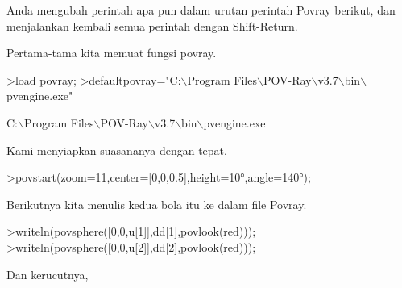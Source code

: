 \documentclass[a4paper,10pt]{article}
\begin{document}
\begin{eulernotebook}
\begin{eulercomment}
\begin{eulercomment}
\begin{eulercomment}
\begin{eulercomment}
\begin{eulercomment}
\begin{eulercomment}
\begin{eulercomment}
\begin{eulercomment}
\begin{eulercomment}
\begin{eulercomment}
\begin{eulercomment}
\begin{eulercomment}
\begin{eulercomment}
\begin{eulercomment}
\begin{eulercomment}
\begin{eulercomment}
\begin{eulercomment}
\begin{eulercomment}
\begin{eulercomment}
\begin{eulercomment}
\begin{eulercomment}
\begin{eulercomment}
\begin{eulercomment}
\begin{eulercomment}
\begin{eulercomment}
\begin{eulercomment}
\begin{eulercomment}
\begin{eulercomment}
\begin{eulercomment}
\begin{eulercomment}
\begin{eulercomment}
\begin{eulercomment}
\begin{eulercomment}
\begin{eulercomment}
\begin{eulercomment}
\begin{eulercomment}
\begin{eulercomment}
\begin{eulercomment}
\begin{eulercomment}
\begin{eulercomment}
\begin{eulercomment}
\begin{eulercomment}
\begin{eulercomment}
\begin{eulercomment}
\begin{eulercomment}
\begin{eulercomment}
\begin{eulercomment}
\begin{eulercomment}
\begin{eulercomment}
\begin{eulercomment}
\begin{eulercomment}
\begin{eulercomment}
\begin{eulercomment}
\begin{eulercomment}
\begin{eulercomment}
\begin{eulercomment}
\begin{eulercomment}
\begin{eulercomment}
\begin{eulercomment}
\begin{eulercomment}
\begin{eulercomment}
\begin{eulercomment}
\begin{eulercomment}
\begin{eulercomment}
\begin{eulercomment}
Anda
mengubah perintah apa pun dalam urutan perintah Povray berikut, dan
menjalankan kembali semua perintah dengan Shift-Return.

Pertama-tama kita memuat fungsi povray.
\end{eulercomment}
\begin{eulerprompt}
>load povray;
>defaultpovray="C:\(\backslash\)Program Files\(\backslash\)POV-Ray\(\backslash\)v3.7\(\backslash\)bin\(\backslash\)pvengine.exe"
\end{eulerprompt}
\begin{euleroutput}
  C:\(\backslash\)Program Files\(\backslash\)POV-Ray\(\backslash\)v3.7\(\backslash\)bin\(\backslash\)pvengine.exe
\end{euleroutput}
\begin{eulercomment}
Kami menyiapkan suasananya dengan tepat.
\end{eulercomment}
\begin{eulerprompt}
>povstart(zoom=11,center=[0,0,0.5],height=10°,angle=140°);
\end{eulerprompt}
\begin{eulercomment}
Berikutnya kita menulis kedua bola itu ke dalam file Povray.
\end{eulercomment}
\begin{eulerprompt}
>writeln(povsphere([0,0,u[1]],dd[1],povlook(red)));
>writeln(povsphere([0,0,u[2]],dd[2],povlook(red)));
\end{eulerprompt}
\begin{eulercomment}
Dan kerucutnya, 
\end{eulercomment}
\end{eulercomment}
\end{eulercomment}
\end{eulercomment}
\end{eulercomment}
\end{eulercomment}
\end{eulercomment}
\end{eulercomment}
\end{eulercomment}
\end{eulercomment}
\end{eulercomment}
\end{eulercomment}
\end{eulercomment}
\end{eulercomment}
\end{eulercomment}
\end{eulercomment}
\end{eulercomment}
\end{eulercomment}
\end{eulercomment}
\end{eulercomment}
\end{eulercomment}
\end{eulercomment}
\end{eulercomment}
\end{eulercomment}
\end{eulercomment}
\end{eulercomment}
\end{eulercomment}
\end{eulercomment}
\end{eulercomment}
\end{eulercomment}
\end{eulercomment}
\end{eulercomment}
\end{eulercomment}
\end{eulercomment}
\end{eulercomment}
\end{eulercomment}
\end{eulercomment}
\end{eulercomment}
\end{eulercomment}
\end{eulercomment}
\end{eulercomment}
\end{eulercomment}
\end{eulercomment}
\end{eulercomment}
\end{eulercomment}
\end{eulercomment}
\end{eulercomment}
\end{eulercomment}
\end{eulercomment}
\end{eulercomment}
\end{eulercomment}
\end{eulercomment}
\end{eulercomment}
\end{eulercomment}
\end{eulercomment}
\end{eulercomment}
\end{eulercomment}
\end{eulercomment}
\end{eulercomment}
\end{eulercomment}
\end{eulercomment}
\end{eulercomment}
\end{eulercomment}
\end{eulercomment}
\end{eulercomment}
\end{eulernotebook}
\end{document}
